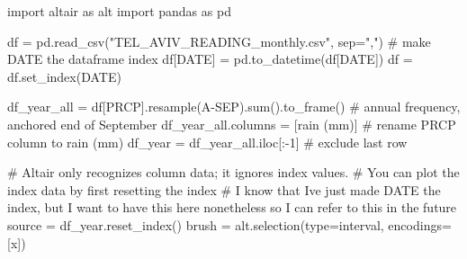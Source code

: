 \documentclass[
  letterpaper,
  DIV=11,
  numbers=noendperiod]{scrreprt}
\newenvironment{Shaded}{\begin{snugshade}}{\end{snugshade}}
\newcommand{\BuiltInTok}[1]{\textcolor[rgb]{0.00,0.23,0.31}{#1}}
\newcommand{\CommentTok}[1]{\textcolor[rgb]{0.37,0.37,0.37}{#1}}
\newcommand{\DecValTok}[1]{\textcolor[rgb]{0.68,0.00,0.00}{#1}}
\newcommand{\ImportTok}[1]{\textcolor[rgb]{0.00,0.46,0.62}{#1}}
\newcommand{\NormalTok}[1]{\textcolor[rgb]{0.00,0.23,0.31}{#1}}
\newcommand{\OperatorTok}[1]{\textcolor[rgb]{0.37,0.37,0.37}{#1}}
\newcommand{\StringTok}[1]{\textcolor[rgb]{0.13,0.47,0.30}{#1}}
\begin{document}
\begin{Shaded}
\begin{Highlighting}[]
\ImportTok{import}\NormalTok{ altair }\ImportTok{as}\NormalTok{ alt}
\ImportTok{import}\NormalTok{ pandas }\ImportTok{as}\NormalTok{ pd}

\NormalTok{df }\OperatorTok{=}\NormalTok{ pd.read\_csv(}\StringTok{"TEL\_AVIV\_READING\_monthly.csv"}\NormalTok{, sep}\OperatorTok{=}\StringTok{","}\NormalTok{)}
\CommentTok{\# make \textquotesingle{}DATE\textquotesingle{} the dataframe index}
\NormalTok{df[}\StringTok{\textquotesingle{}DATE\textquotesingle{}}\NormalTok{] }\OperatorTok{=}\NormalTok{ pd.to\_datetime(df[}\StringTok{\textquotesingle{}DATE\textquotesingle{}}\NormalTok{])}
\NormalTok{df }\OperatorTok{=}\NormalTok{ df.set\_index(}\StringTok{\textquotesingle{}DATE\textquotesingle{}}\NormalTok{)}

\NormalTok{df\_year\_all }\OperatorTok{=}\NormalTok{ df[}\StringTok{\textquotesingle{}PRCP\textquotesingle{}}\NormalTok{].resample(}\StringTok{\textquotesingle{}A{-}SEP\textquotesingle{}}\NormalTok{).}\BuiltInTok{sum}\NormalTok{().to\_frame()  }\CommentTok{\# annual frequency, anchored end of September}
\NormalTok{df\_year\_all.columns }\OperatorTok{=}\NormalTok{ [}\StringTok{\textquotesingle{}rain (mm)\textquotesingle{}}\NormalTok{] }\CommentTok{\# rename \textquotesingle{}PRCP\textquotesingle{} column to \textquotesingle{}rain (mm)\textquotesingle{}}
\NormalTok{df\_year }\OperatorTok{=}\NormalTok{ df\_year\_all.iloc[:}\OperatorTok{{-}}\DecValTok{1}\NormalTok{]  }\CommentTok{\# exclude last row}

\CommentTok{\# Altair only recognizes column data; it ignores index values.}
\CommentTok{\# You can plot the index data by first resetting the index}
\CommentTok{\# I know that I\textquotesingle{}ve just made \textquotesingle{}DATE\textquotesingle{} the index, but I want to have this here nonetheless so I can refer to this in the future}
\NormalTok{source }\OperatorTok{=}\NormalTok{ df\_year.reset\_index()}
\NormalTok{brush }\OperatorTok{=}\NormalTok{ alt.selection(}\BuiltInTok{type}\OperatorTok{=}\StringTok{\textquotesingle{}interval\textquotesingle{}}\NormalTok{, encodings}\OperatorTok{=}\NormalTok{[}\StringTok{\textquotesingle{}x\textquotesingle{}}\NormalTok{])}


\end{Highlighting}
\end{Shaded}
\end{document}
